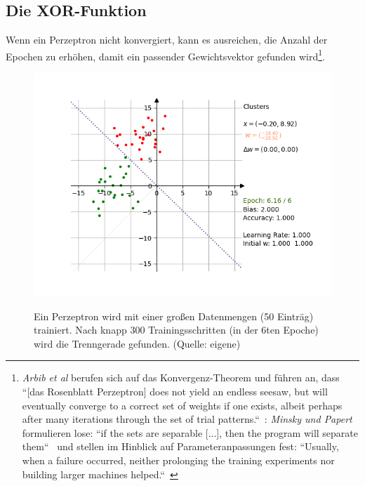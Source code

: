 \noindent{}




\subsection{Die XOR-Funktion}

Wenn ein Perzeptron nicht konvergiert, kann es ausreichen, die Anzahl der Epochen zu erhöhen, damit ein passender Gewichtsvektor gefunden wird\footnote{
    \textit{Arbib et al} berufen sich auf das Konvergenz-Theorem und führen an, dass ``[das Rosenblatt Perzeptron] does not yield an endless seesaw, but will eventually converge to a correct set of weights if one exists, albeit perhaps after many iterations through the set of trial patterns.``~\cite[20]{Arb03}: \textit{Minsky und Papert} formulieren lose: ``if the sets are separable [...], then the program will separate them``~\cite[165]{MP88} und stellen im Hinblick auf Parameteranpassungen fest: ``Usually, when a failure occurred, neither prolonging the training experiments nor building larger machines helped.``~\cite[xi]{MP88}
}.

\begin{figure}[h]
    \centering
    \includegraphics{images/rosenblatt/blob_success.png}
    \caption{}
    \label{fig-rp-blobs}
    \small Ein Perzeptron wird mit einer großen Datenmengen (50 Einträg) trainiert. Nach knapp 300 Trainingsschritten (in der 6ten Epoche) wird die Trenngerade gefunden. (Quelle: eigene)
\end{figure}

